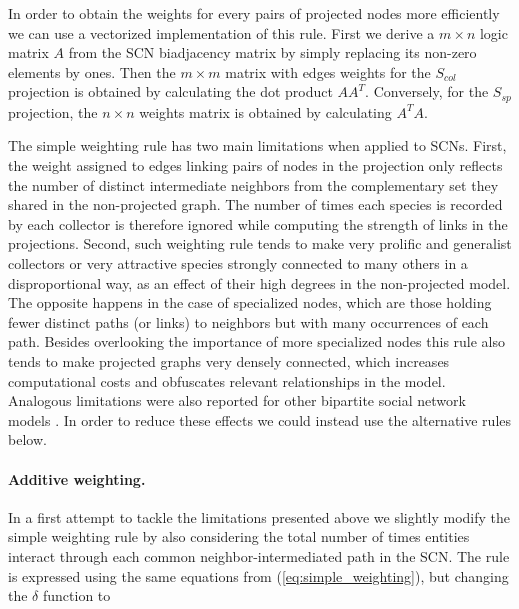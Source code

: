 In order to obtain the weights for every pairs of projected nodes more efficiently we can use a vectorized implementation of this rule. First we derive a $m\times n$ logic matrix $A$ from the SCN biadjacency matrix by simply replacing its non-zero elements by ones. 
Then the $m \times m$ matrix with edges weights for the $S_{col}$ projection is obtained by calculating the dot product $A A^T$.
Conversely, for the $S_{sp}$ projection, the $n \times n$ weights matrix is obtained by calculating $A^T A$.

The simple weighting rule has two main limitations when applied to SCNs.
First, the weight assigned to edges linking pairs of nodes in the projection only reflects the number of distinct intermediate neighbors from the complementary set they shared in the non-projected graph. The number of times each species is recorded by each collector is therefore ignored while computing the strength of links in the projections.
Second, such weighting rule tends to make very prolific and generalist collectors or very attractive species strongly connected to many others in a disproportional way, as an effect of their high degrees in the non-projected model. The opposite happens in the case of specialized nodes, which are those holding fewer distinct paths (or links) to neighbors but with many occurrences of each path. Besides overlooking the importance of more specialized nodes this rule also tends to make projected graphs very densely connected, which increases computational costs and obfuscates relevant relationships in the model. Analogous limitations were also reported for other bipartite social network models \cite{Lambiotte2005}.
In order to reduce these effects we could instead use the alternative rules below.

\paragraph*{Additive weighting.}
In a first attempt to tackle the limitations presented above we slightly modify the simple weighting rule by also considering the total number of times entities interact through each common neighbor-intermediated path in the SCN. The rule is expressed using the same equations from (\ref{eq:simple_weighting}), but changing the $\delta$ function to
 
